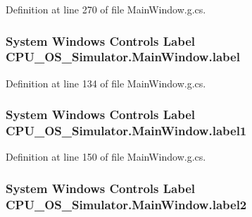 Definition at line 270 of file Main\+Window.\+g.\+cs.

\hypertarget{class_c_p_u___o_s___simulator_1_1_main_window_ad60038602dcf5d954e420bee89c8494d}{}
\subsubsection[{label}]{\setlength{\rightskip}{0pt plus 5cm}System Windows Controls Label C\+P\+U\+\_\+\+O\+S\+\_\+\+Simulator.\+Main\+Window.\+label\hspace{0.3cm}{\ttfamily [package]}}\label{class_c_p_u___o_s___simulator_1_1_main_window_ad60038602dcf5d954e420bee89c8494d}


Definition at line 134 of file Main\+Window.\+g.\+cs.

\hypertarget{class_c_p_u___o_s___simulator_1_1_main_window_a09b3ba374a620331bc447b32959260c2}{}
\subsubsection[{label1}]{\setlength{\rightskip}{0pt plus 5cm}System Windows Controls Label C\+P\+U\+\_\+\+O\+S\+\_\+\+Simulator.\+Main\+Window.\+label1\hspace{0.3cm}{\ttfamily [package]}}\label{class_c_p_u___o_s___simulator_1_1_main_window_a09b3ba374a620331bc447b32959260c2}


Definition at line 150 of file Main\+Window.\+g.\+cs.

\hypertarget{class_c_p_u___o_s___simulator_1_1_main_window_a88c7b6748a5e198c673a3c3c5178d3b8}{}
\subsubsection[{label2}]{\setlength{\rightskip}{0pt plus 5cm}System Windows Controls Label C\+P\+U\+\_\+\+O\+S\+\_\+\+Simulator.\+Main\+Window.\+label2\hspace{0.3cm}{\ttfamily [package]}}\label{class_c_p_u___o_s___simulator_1_1_main_window_a88c7b6748a5e198c673a3c3c5178d3b8}


